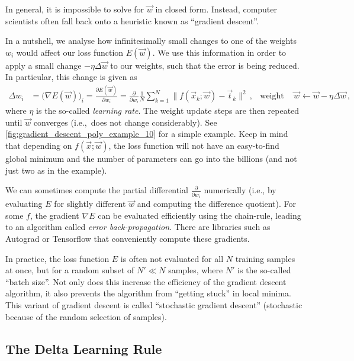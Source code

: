 \documentclass[10pt,letterpaper,oneside]{article}
\begin{document}
In general, it is impossible to solve for $\vec w$ in closed form. Instead, computer scientists often fall back onto a heuristic known as \enquote{gradient descent}.

In a nutshell, we analyse how infinitesimally small changes to one of the weights $w_i$ would affect our loss function $E(\vec w)$. We use this information in order to apply a small change $- \eta \Delta \vec w$ to our weights, such that the error is being reduced. In particular, this change is given as
\begin{align*}
	\Delta w_i &= \big( \nabla E(\vec w) \big)_i =  \frac{\partial E(\vec w)}{\partial w_i} = \frac{\partial}{\partial w_i} \frac{1}{N} \sum_{k = 1}^N \big\| f(\vec x_k ; \vec w) - \vec t_k \big\|^2 \,, & \text{weight update step } \vec w &\gets \vec w - \eta \Delta \vec w \,,
\end{align*}
where $\eta$ is the so-called \emph{learning rate}. The weight update steps are then repeated until $\vec w$ converges (i.e.,~does not change considerably). See \cref{fig:gradient_descent_poly_example_10} for a simple example. Keep in mind that depending on $f(\vec x; \vec w)$, the loss function will not have an easy-to-find  global minimum and the number of parameters can go into the billions (and not just two as in the example).

We can sometimes compute the partial differential $\frac{\partial}{\partial w_i}$ numerically (i.e., by evaluating $E$ for slightly different $\vec w$ and computing the difference quotient). For some $f$, the gradient $\nabla E$ can be evaluated efficiently using the chain-rule, leading to an algorithm called \emph{error back-propagation}. There are libraries such as Autograd or Tensorflow that conveniently compute these gradients.

In practice, the loss function $E$ is often not evaluated for all $N$ training samples at once, but for a random subset of $N' \ll N$ samples, where $N'$ is the so-called \enquote{batch size}. Not only does this increase the efficiency of the gradient descent algorithm, it also prevents the algorithm from \enquote{getting stuck} in local minima. This variant of gradient descent is called \enquote{stochastic gradient descent} (stochastic because of the random selection of samples).

\subsection{The Delta Learning Rule}
\end{document}
